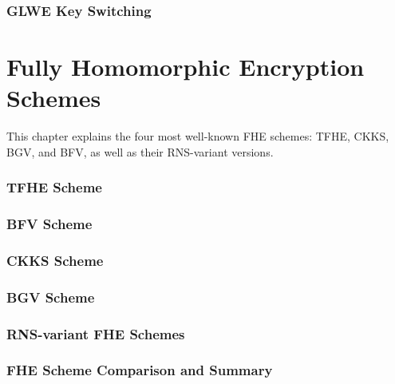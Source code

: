 \documentclass[11pt]{article}
\begin{document}
\clearpage


\section{GLWE Key Switching}
\label{sec:glwe-key-switching}




\clearpage


%


\part{Fully Homomorphic Encryption Schemes}
\label{part:fhe-schemes}

\renewcommand{\thesection}{D-\arabic{section}}
\setcounter{section}{0}

This chapter explains the four most well-known FHE schemes: TFHE, CKKS, BGV, and BFV, as well as their RNS-variant versions. 

\newpage

\section{TFHE Scheme}
\label{sec:tfhe}



\newpage

\section{BFV Scheme}
\label{sec:bfv}


\newpage

\section{CKKS Scheme}
\label{sec:ckks}



\clearpage

\section{BGV Scheme}
\label{sec:bgv}


\clearpage


\section{RNS-variant FHE Schemes}
\label{sec:rns}


\clearpage

\section{FHE Scheme Comparison and Summary}



\clearpage
%







%
\end{document}
